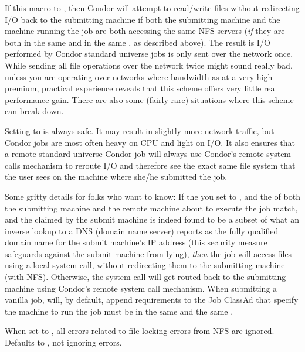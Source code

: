 \begin{description}
  If this macro to , then Condor will attempt to
  read/write files without redirecting I/O back to the submitting
  machine if both the submitting machine and the machine running the job
  are both accessing the same NFS servers (\emph{if} they are both in the
  same  and in the same ,
  as described above).  The result is I/O performed by Condor standard
  universe jobs is only sent over the network once.  
  While sending all file operations over the network twice might sound
  really bad, unless you are operating over networks where bandwidth
  as at a very high premium, practical experience reveals that this
  scheme offers very little real performance gain.  There are also
  some (fairly rare) situations where this scheme can break down.
  
  Setting  to  is always safe.  It may result
  in slightly more network traffic, but Condor jobs are most often heavy
  on CPU and light on I/O.  It also ensures that a remote
  standard universe Condor job will always use Condor's remote system
  calls mechanism to reroute I/O and therefore see the exact same
  file system that the user sees on the machine where she/he submitted
  the job.
  
  Some gritty details for folks who want to know: If the you set
   to , and the  of
  both the submitting machine and the remote machine about to execute
  the job match, and the  claimed by the
  submit machine is indeed found to be a subset of what an inverse
  lookup to a DNS (domain name server) reports as the fully qualified
  domain name for the submit machine's IP address (this security
  measure safeguards against the submit machine from lying),
  \emph{then} the job will access files using a local system call,
  without redirecting them to the submitting machine (with
  NFS).  Otherwise, the system call will get routed back to the
  submitting machine using Condor's remote system call mechanism.
  \Note When submitting a vanilla job,  will, by default,
  append requirements to the Job ClassAd that specify the machine to run
  the job must be in the same  and the same
  .

\item[\Macro{IGNORE\_NFS\_LOCK\_ERRORS}] \label{param:IgnoreNFSLockErrors}
  When set to , all errors related to file locking errors from
  NFS are ignored.
  Defaults to , not ignoring errors.
  

\end{description}
